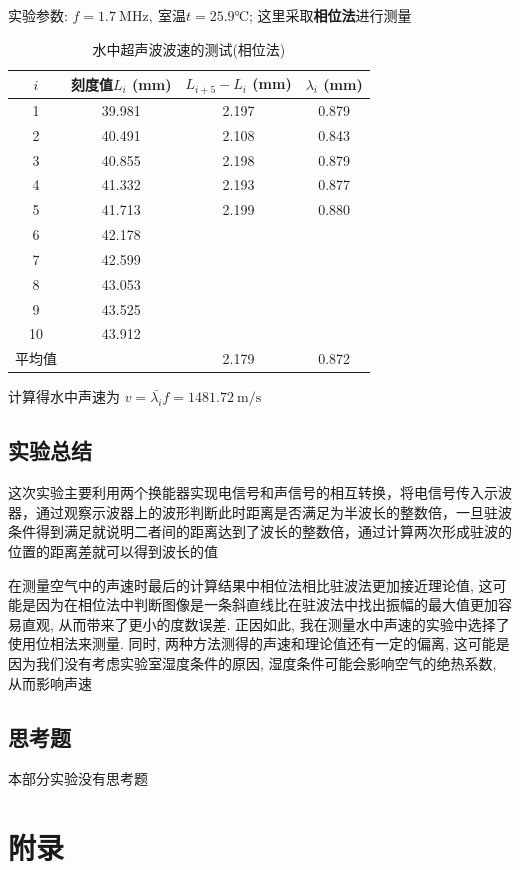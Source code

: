 \documentclass[zihao=5, UTF8]{article}
\theoremstyle{MyLineTheoremStyle} %
\theoremstyle{MyBlockTheoremStyle} %
\theoremstyle{MySubsubsectionStyle} %
\begin{document}
实验参数: $f = 1.7\  \mathrm{MHz},\  \text{室温} t = 25.9℃$; 这里采取\textbf{相位法}进行测量
\begin{table}[H]
\centering
\begin{tabular}{|c|c|c|c|} 
\hline
$i$  & 刻度值$L_i$ (mm)  & $L_{i + 5} - L_i$ (mm) & $\lambda_i$ (mm) \\ 
\hline
1   & 39.981 & 2.197 & 0.879  \\ 
\hline
2   & 40.491 & 2.108 & 0.843  \\ 
\hline
3   & 40.855 & 2.198 & 0.879  \\ 
\hline
4   & 41.332 & 2.193 & 0.877  \\ 
\hline
5   & 41.713 & 2.199 & 0.880  \\ 
\hline
6   & 42.178 &       &        \\ 
\hline
7   & 42.599 &       &        \\ 
\hline
8   & 43.053 &       &        \\ 
\hline
9   & 43.525 &       &        \\ 
\hline
10  & 43.912 &       &        \\ 
\hline
平均值 &        & 2.179 & 0.872  \\
\hline
\end{tabular}
\caption{水中超声波波速的测试(相位法)}
\end{table}

计算得水中声速为 $v = \bar{\lambda_i} f = 1481.72 \ \mathrm{m/s}$
\subsection{实验总结}
这次实验主要利用两个换能器实现电信号和声信号的相互转换，将电信号传入示波器，通过观察示波器上的波形判断此时距离是否满足为半波长的整数倍，一旦驻波条件得到满足就说明二者间的距离达到了波长的整数倍，通过计算两次形成驻波的位置的距离差就可以得到波长的值

在测量空气中的声速时最后的计算结果中相位法相比驻波法更加接近理论值, 这可能是因为在相位法中判断图像是一条斜直线比在驻波法中找出振幅的最大值更加容易直观, 从而带来了更小的度数误差. 正因如此, 我在测量水中声速的实验中选择了使用位相法来测量. 同时, 两种方法测得的声速和理论值还有一定的偏离, 这可能是因为我们没有考虑实验室湿度条件的原因, 湿度条件可能会影响空气的绝热系数, 从而影响声速

\subsection{思考题}
本部分实验没有思考题
\section{附录}


\end{document}

